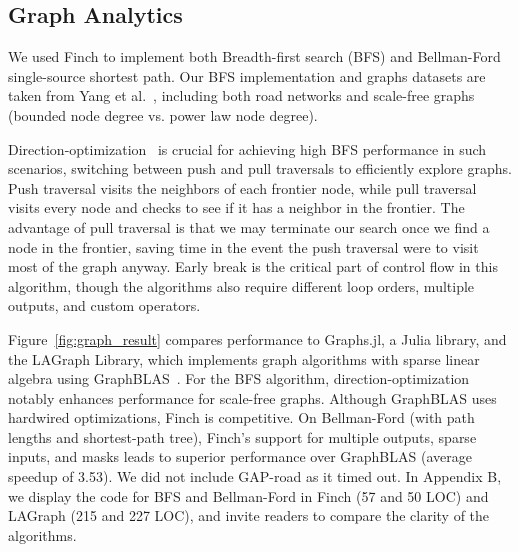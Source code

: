 \subsection{Graph Analytics}

We used Finch to implement both Breadth-first search (BFS) and Bellman-Ford single-source shortest path.
%
Our BFS implementation and graphs datasets are taken from Yang et al.~\cite{yang_implementing_2018}, including both road networks and scale-free graphs (bounded node degree vs. power law node degree).


Direction-optimization~\cite{beamer2012direction} is crucial for achieving high BFS performance in such scenarios, switching between push and pull traversals to efficiently explore graphs.
%
Push traversal visits the neighbors of each frontier node, while pull traversal visits every node and checks to see if it has a neighbor in the frontier. 
%
The advantage of pull traversal is that we may terminate our search once we find a node in the frontier, saving time in the event the push traversal were to visit most of the graph anyway. 
%
Early break is the critical part of control flow in this algorithm, though the algorithms also require different loop orders, multiple outputs, and custom operators.

Figure~\ref{fig:graph_result} compares performance to Graphs.jl, a Julia library, and the LAGraph Library, which implements graph algorithms with sparse linear algebra using GraphBLAS~\cite{mattson2019lagraph}.
%
For the BFS algorithm, direction-optimization notably enhances performance for scale-free graphs. 
%
Although GraphBLAS uses hardwired optimizations, Finch is competitive. 
%
On Bellman-Ford (with path lengths and shortest-path tree), Finch's support for multiple outputs, sparse inputs, and masks leads to superior performance over GraphBLAS (average speedup of 3.53). 
%
We did not include GAP-road as it timed out. %
%
In Appendix B, we display the code for BFS and Bellman-Ford in Finch (57 and 50 LOC) and LAGraph (215 and 227 LOC), and invite readers to compare the clarity of the algorithms.
 
